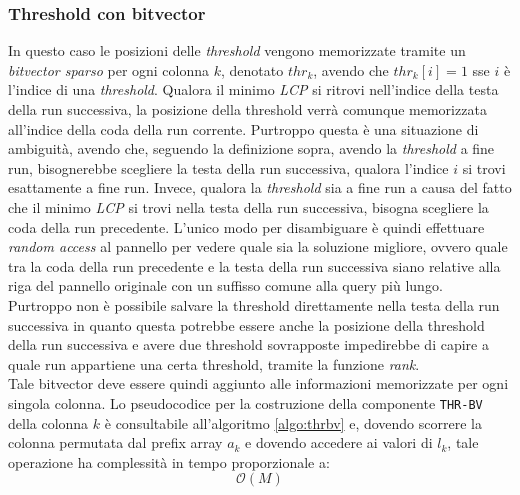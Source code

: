 \subsubsection{Threshold con bitvector}
In questo caso le posizioni delle \textit{threshold} vengono
memorizzate tramite un \textit{bitvector sparso} per ogni colonna $k$, denotato
$thr_k$, avendo che $thr_k[i]=1$ sse $i$ è l'indice di una \textit{threshold}.
Qualora il minimo \textit{LCP} si ritrovi nell'indice della testa della run
successiva, la posizione della threshold verrà comunque memorizzata all'indice
della coda della run corrente. Purtroppo questa è una situazione di ambiguità,
avendo che, seguendo la definizione sopra, avendo la \textit{threshold} a fine
run, bisognerebbe scegliere la testa della run successiva, qualora l'indice $i$
si trovi esattamente a fine run. Invece, qualora la
\textit{threshold} sia a fine run a causa del fatto che il minimo \textit{LCP}
si trovi nella testa della run successiva, bisogna scegliere la coda della run
precedente. L'unico modo per disambiguare è quindi effettuare \textit{random
  access} al pannello per vedere quale sia la
soluzione migliore, ovvero quale tra la coda della run precedente e la testa
della run successiva siano relative alla riga del pannello originale con un
suffisso comune alla query più lungo.\\
Purtroppo non è possibile salvare la threshold direttamente nella testa della
run successiva in quanto questa potrebbe essere anche la posizione della
threshold della run successiva e avere due threshold sovrapposte impedirebbe di
capire a quale run appartiene una certa threshold, tramite la funzione
\textit{rank}. \\
Tale bitvector deve essere quindi aggiunto alle informazioni memorizzate per
ogni singola colonna. Lo pseudocodice per la costruzione della componente
\texttt{THR-BV} della colonna $k$ è consultabile all'algoritmo \ref{algo:thrbv}
e, dovendo scorrere la colonna permutata dal prefix array $a_k$ e dovendo
accedere ai valori di $l_k$, tale operazione ha complessità in tempo
proporzionale a:
\begin{equation}
  \label{eq:thrbv}
  \mathcal{O}(M)
\end{equation}
